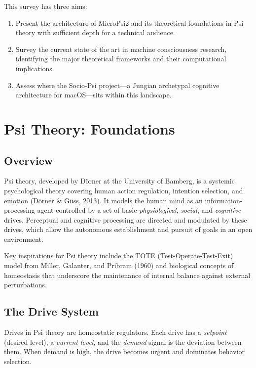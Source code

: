 \documentclass[11pt,letterpaper]{article}
\begin{document}
This survey has three aims:
\begin{enumerate}
  \item Present the architecture of MicroPsi2 and its theoretical
    foundations in Psi theory with sufficient depth for a technical audience.
  \item Survey the current state of the art in machine consciousness
    research, identifying the major theoretical frameworks and their
    computational implications.
  \item Assess where the Socio-Psi project---a Jungian archetypal
    cognitive architecture for macOS---sits within this landscape.
\end{enumerate}

\section{Psi Theory: Foundations}
\label{sec:psi}

\subsection{Overview}

Psi theory, developed by D\"orner at the University of Bamberg, is a
systemic psychological theory covering human action regulation, intention
selection, and emotion (D\"orner \& G\"uss, 2013). It models the human mind
as an information-processing agent controlled by a set of basic
\emph{physiological}, \emph{social}, and \emph{cognitive} drives. Perceptual
and cognitive processing are directed and modulated by these drives, which
allow the autonomous establishment and pursuit of goals in an open
environment.

Key inspirations for Psi theory include the TOTE (Test-Operate-Test-Exit)
model from Miller, Galanter, and Pribram (1960) and biological concepts of
homeostasis that underscore the maintenance of internal balance against
external perturbations.

\subsection{The Drive System}

Drives in Psi theory are homeostatic regulators. Each drive has a
\emph{setpoint} (desired level), a \emph{current level}, and the
\emph{demand} signal is the deviation between them. When demand is high,
the drive becomes urgent and dominates behavior selection.
\end{document}
